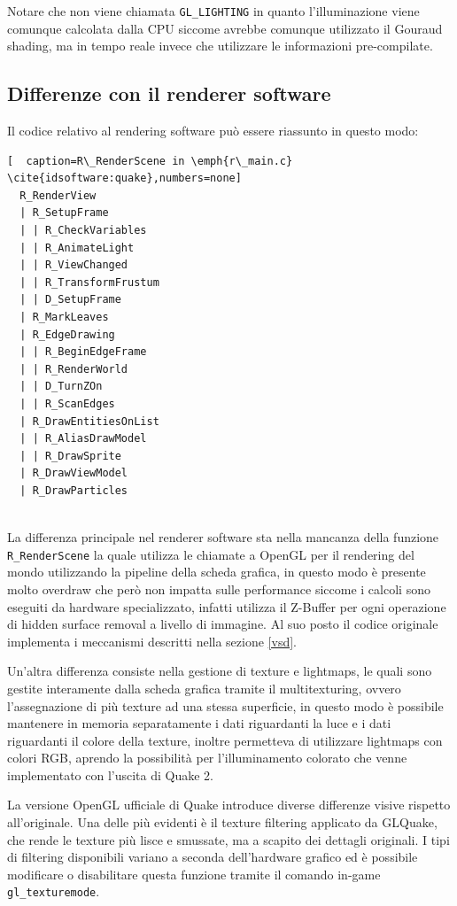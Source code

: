 \documentclass[12pt, letterpaper]{article}
\begin{document}
Notare che non viene chiamata \texttt{GL\_LIGHTING} in quanto l'illuminazione viene comunque calcolata dalla CPU siccome avrebbe comunque utilizzato il Gouraud shading, ma in tempo reale invece che utilizzare le informazioni pre-compilate.
  
\subsection{Differenze con il renderer software}

Il codice relativo al rendering software può essere riassunto in questo modo:

\begin{lstlisting}[  caption=R\_RenderScene in \emph{r\_main.c} \cite{idsoftware:quake},numbers=none]
  R_RenderView
  | R_SetupFrame
  | | R_CheckVariables
  | | R_AnimateLight
  | | R_ViewChanged
  | | R_TransformFrustum
  | | D_SetupFrame
  | R_MarkLeaves
  | R_EdgeDrawing
  | | R_BeginEdgeFrame
  | | R_RenderWorld
  | | D_TurnZOn
  | | R_ScanEdges
  | R_DrawEntitiesOnList
  | | R_AliasDrawModel
  | | R_DrawSprite
  | R_DrawViewModel
  | R_DrawParticles
  
\end{lstlisting}

La differenza principale nel renderer software sta nella mancanza della funzione \texttt{R\_RenderScene} la quale utilizza le chiamate a OpenGL per il rendering del mondo utilizzando la pipeline della scheda grafica, in questo modo è presente molto overdraw che però non impatta sulle performance siccome i calcoli sono eseguiti da hardware specializzato, infatti utilizza il Z-Buffer per ogni operazione di hidden surface removal a livello di immagine. Al suo posto il codice originale implementa i meccanismi descritti nella sezione \ref{vsd}.

Un'altra differenza consiste nella gestione di texture e lightmaps, le quali sono gestite interamente dalla scheda grafica tramite il multitexturing, ovvero l'assegnazione di più texture ad una stessa superficie, in questo modo è possibile mantenere in memoria separatamente i dati riguardanti la luce e i dati riguardanti il colore della texture, inoltre permetteva di utilizzare lightmaps con colori RGB, aprendo la possibilità per l'illuminamento colorato che venne implementato con l'uscita di Quake 2.

La versione OpenGL ufficiale di Quake introduce diverse differenze visive rispetto all'originale. Una delle più evidenti è il texture filtering applicato da GLQuake, che rende le texture più lisce e smussate, ma a scapito dei dettagli originali. I tipi di filtering disponibili variano a seconda dell'hardware grafico ed è possibile modificare o disabilitare questa funzione tramite il comando in-game \texttt{gl\_texturemode}.
\end{document}
